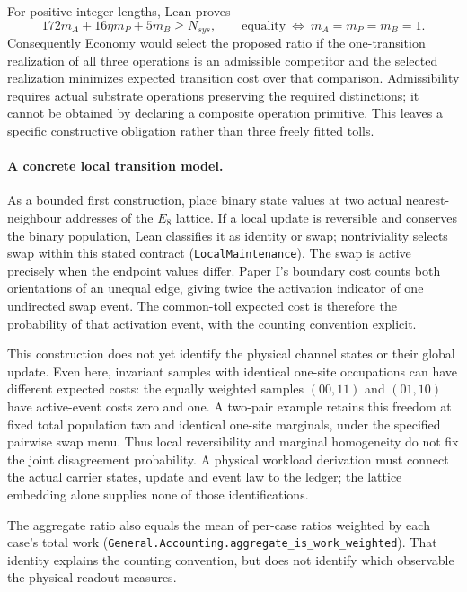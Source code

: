 For positive integer lengths, Lean proves
\begin{equation}
 172m_A+16\eta m_P+5m_B\geq N_{sys},
 \qquad\text{equality}\ \Longleftrightarrow\ m_A=m_P=m_B=1.
\end{equation}
Consequently Economy would select the proposed ratio if the one-transition
realization of all three operations is an admissible competitor and the selected
realization minimizes expected transition cost over that comparison. Admissibility
requires actual substrate operations preserving the required distinctions; it
cannot be obtained by declaring a composite operation primitive. This leaves a
specific constructive obligation rather than three freely fitted tolls.

\paragraph{A concrete local transition model.}
As a bounded first construction, place binary state values at two actual
nearest-neighbour addresses of the $E_8$ lattice. If a local update is reversible
and conserves the binary population, Lean classifies it as identity or swap;
nontriviality selects swap within this stated contract
(\texttt{LocalMaintenance}). The swap is active precisely when the endpoint
values differ. Paper I's boundary cost counts both orientations of an unequal
edge, giving twice the activation indicator of one undirected swap event.
The common-toll expected cost is therefore the probability of that activation
event, with the counting convention explicit.

This construction does not yet identify the physical channel states or their
global update. Even here, invariant samples with identical one-site occupations
can have different expected costs: the equally weighted samples $(00,11)$ and
$(01,10)$ have active-event costs zero and one. A two-pair example retains this
freedom at fixed total population two and identical one-site marginals, under
the specified pairwise swap menu. Thus local reversibility and marginal
homogeneity do not fix the joint disagreement probability. A physical workload
derivation must connect the actual carrier states, update and event law to the
ledger; the lattice embedding alone supplies none of those identifications.

The aggregate ratio also equals the mean of per-case ratios weighted by each
case's total work (\texttt{General.Accounting.aggregate\_is\_work\_weighted}).
That identity explains the counting convention, but does not identify which
observable the physical readout measures.

